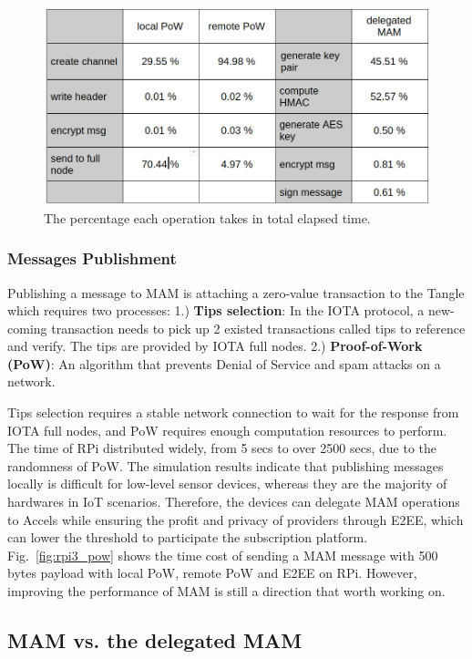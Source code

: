 \documentclass[10pt, conference, compsocconf]{IEEEtran}
\begin{document}
\begin{figure}[!htb]
\endminipage\hfill
{}%
  \includegraphics[width=\linewidth]{op_share}
  \caption{The percentage each operation takes in total elapsed time.}\label{fig:op_share}  
\endminipage
\end{figure}

\subsubsection{Messages Publishment}
Publishing a message to MAM is attaching a zero-value transaction to the Tangle which requires two processes: 1.) \textbf{Tips selection}: In the IOTA protocol, a new-coming transaction needs to pick up 2 existed transactions called tips to reference and verify. The tips are provided by IOTA full nodes. 2.) \textbf{Proof-of-Work (PoW)}: An algorithm that prevents Denial of Service and spam attacks on a network.

Tips selection requires a stable network connection to wait for the response from IOTA full nodes, and PoW requires enough computation resources to perform. The time of RPi distributed widely, from 5 secs to over 2500 secs, due to the randomness of PoW. The simulation results indicate that publishing messages locally is difficult for low-level sensor devices, whereas they are the majority of hardwares in IoT scenarios. Therefore, the devices can delegate MAM operations to Accels while ensuring the profit and privacy of providers through E2EE, which can lower the threshold to participate the subscription platform. Fig.~\ref{fig:rpi3_pow} shows the time cost of sending a MAM message with 500 bytes payload with local PoW, remote PoW and E2EE on RPi. However, improving the performance of MAM is still a direction that worth working on.

\subsection{MAM vs. the delegated MAM}
\label{section:smart_contract_evaluation}
\end{document}
